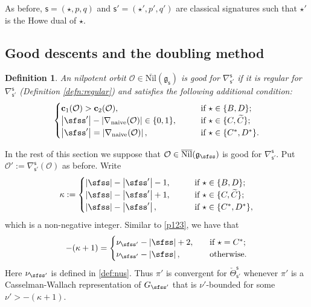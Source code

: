 \documentclass[11pt,a4paper]{amsart}
\def\abs#1{\left|{#1}\right|}
\newcommand{\CO}{{\mathcal {O}}}
\newcommand{\g}{\mathfrak g}
\def\DD{\nabla}
\newcommand{\be}{\begin {equation}}
\newcommand{\ee}{\end {equation}}
\numberwithin{equation}{section}
\newtheorem{defn}[thm]{Definition}
\theoremstyle{remark}
\def\Nil{\overline{\mathrm{Nil}}}
\begin{document}
As before, $\mathsf s=(\star, p,q)$ and $ \mathsf s'=(\star', p',q')$ are classical signatures such that $\star'$ is the Howe dual of $\star$.


\subsection{Good descents and the doubling method}\label{subsec:gdescent}


\begin{defn}
An nilpotent orbit $\CO\in \Nil(\g_\mathsf s)$ is good for $\DD_{\mathsf s'}^{\mathsf s}$ if it is regular for $\DD_{\mathsf s'}^{\mathsf s}$ (Definition \ref{defn:regular}) and satisfies the following additional condition:
\[
\begin{cases}
   \mathbf c_1(\CO)>\mathbf c_2(\CO), \qquad  &\textrm{if $\star \in\{B,D\}$}; \\
      \abs{\sfss'}-\abs{\DD_\mathrm{naive}(\CO)}\in\{0,1\},\qquad  &\textrm{if $\star \in\{C, \widetilde C\}$}; \\
\abs{\sfss'}=\abs{\DD_\mathrm{naive}(\CO)}, \qquad &\textrm{if $\star \in \{C^*, D^*\}$}.
  \end{cases}
\]

\end{defn}

In the rest of this section we suppose that $\CO\in \Nil(\g_\sfss)$ is good for $\DD_{\mathsf s'}^{\mathsf s}$. Put $\CO':=\DD_{\mathsf s'}^{\mathsf s}(\CO)$ as before. Write
 \[
  \kappa :=\begin{cases}
    \abs{\sfss}-\abs{\sfss'}-1, \qquad  &\textrm{if $\star \in\{B,D\}$}; \\
       \abs{\sfss}-\abs{\sfss'}+1, \qquad  &\textrm{if $\star \in\{C, \widetilde C\}$}; \\
 \abs{\sfss}-\abs{\sfss'},\qquad  &\textrm{if $\star \in \{C^*, D^*\}$},
  \end{cases}
\]
which is a non-negative integer.
Similar to \eqref{p123}, we have that
\be\label{p1234}
-(\kappa+1)=
  \begin{cases}
 \nu_{\sfss'}-\abs{\sfss} +2,\quad& \textrm{if $\star =C^*$};\\
  \nu_{\sfss'}-\abs{\sfss},\quad& \textrm{otherwise}.
   \end{cases}
   \ee
Here $\nu_{\sfss'}$ is defined in \eqref{def:nus}. Thus $\pi'$ is convergent for $\check \Theta_{\mathsf s'}^{\mathsf s}$ whenever $\pi'$ is a Casselman-Wallach representation of $G_{\sfss'}$  that is  $\nu'$-bounded for some
$\nu'> -(\kappa +1)$. 
\end{document}
